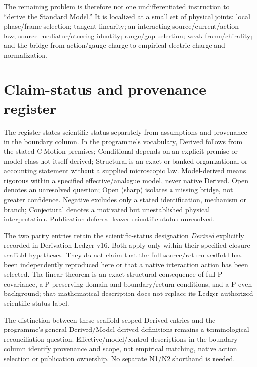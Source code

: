 \documentclass[11pt]{article}
\theoremstyle{definition}
\begin{document}
The remaining problem is therefore not one undifferentiated instruction to ``derive the Standard Model.''  It is localized at a small set of physical joints: local phase/frame selection; tangent-linearity; an interacting source/current/action law; source--mediator/steering identity; range/gap selection; weak-frame/chirality; and the bridge from action/gauge charge to empirical electric charge and normalization.

\section{Claim-status and provenance register}
\label{sec:status_register}

The register states scientific status separately from assumptions and provenance
in the boundary column.  In the programme's vocabulary, Derived follows from
the stated C-Motion premises; Conditional depends on an explicit premise or
model class not itself derived; Structural is an exact or banked organizational
or accounting statement without a supplied microscopic law.  Model-derived
means rigorous within a specified effective/analogue model, never native Derived.
Open denotes an unresolved question; Open (sharp) isolates a missing bridge,
not greater confidence.  Negative excludes only a stated identification,
mechanism or branch; Conjectural denotes a motivated but unestablished physical
interpretation.  Publication deferral leaves scientific status unresolved.


The two parity entries retain the scientific-status designation
\emph{Derived} explicitly recorded in Derivation Ledger v16.  Both
apply only within their specified closure-scaffold hypotheses.  They
do not claim that the full source/return scaffold has been independently
reproduced here or that a native interaction action has been selected.
The linear theorem is an exact structural consequence of full
P covariance, a P-preserving domain and boundary/return conditions,
and a P-even background; that mathematical description does not replace
its Ledger-authorized scientific-status label.

The distinction between these scaffold-scoped Derived entries and the
programme's general Derived/Model-derived definitions remains a
terminological reconciliation question.  Effective/model/control
descriptions in the boundary column identify provenance and scope,
not empirical matching, native action selection or publication
ownership.  No separate N1/N2 shorthand is needed.
\end{document}
